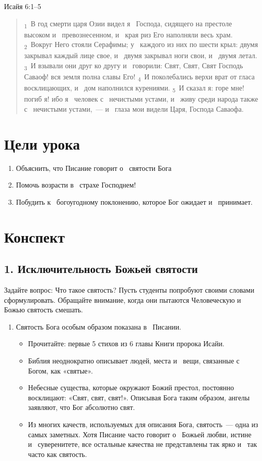 \documentclass[a4paper,12pt]{article}
\begin{document}
Исайя 6:1--5

\begin{quote}
\textsubscript{1}~В год смерти царя Озии видел я~ Господа, сидящего на престоле высоком и~ превознесенном, и~ края риз Его наполняли весь храм. 
\textsubscript{2}~Вокруг Него стояли Серафимы; у~ каждого из них по шести крыл: двумя закрывал каждый лице свое, и~ двумя закрывал ноги свои, и~ двумя летал. 
\textsubscript{3}~И взывали они друг ко другу и~ говорили: Свят, Свят, Свят Господь Саваоф! вся земля полна славы Его! 
\textsubscript{4}~И поколебались верхи врат от гласа восклицающих, и~ дом наполнился курениями. 
\textsubscript{5}~И сказал я: горе мне! погиб я! ибо я~ человек с~ нечистыми устами, и~ живу среди народа также с~ нечистыми устами,~--- и~ глаза мои видели Царя, Господа Саваофа. 
\end{quote}

\section{Цели урока}
\begin{enumerate}
    \item Объяснить, что Писание говорит о~ святости Бога
    \item  Помочь возрасти в~ страхе Господнем!
    \item  Побудить к~ богоугодному поклонению, которое Бог ожидает и~ принимает.
\end{enumerate}

\section{Конспект}

\subsection{1. Исключительность Божьей святости}

Задайте вопрос: Что такое святость? Пусть студенты попробуют своими словами сформулировать. Обращайте внимание, когда они пытаются Человеческую и~ Божью святость смешать.

\begin{enumerate}
    \item Святость Бога особым образом показана в~ Писании.
    \begin{itemize}
        \item Прочитайте: первые 5 стихов из 6 главы Книги пророка Исайи.
        \item Библия неоднократно описывает людей, места и~ вещи, связанные с~ Богом, как «святые».
        \item Небесные существа, которые окружают Божий престол, постоянно восклицают: «Свят, свят, свят!». Описывая Бога таким образом, ангелы заявляют, что Бог абсолютно свят. 
        \item Из многих качеств, используемых для описания Бога, святость~--- одна из самых заметных. Хотя Писание часто говорит о~ Божьей любви, истине и~ суверенитете, все остальные качества не представлены так ярко и~ так часто как святость.
    \end{itemize}
\end{enumerate}
        
\end{document}
